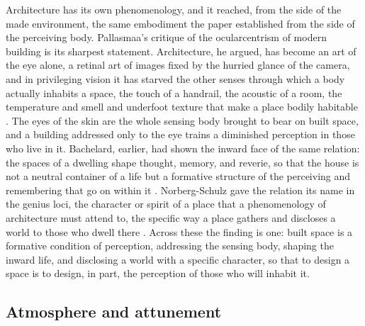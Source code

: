 Architecture has its own phenomenology, and it reached, from the side of the made environment, the same embodiment the paper established from the side of the perceiving body. Pallasmaa's critique of the ocularcentrism of modern building is its sharpest statement. Architecture, he argued, has become an art of the eye alone, a retinal art of images fixed by the hurried glance of the camera, and in privileging vision it has starved the other senses through which a body actually inhabits a space, the touch of a handrail, the acoustic of a room, the temperature and smell and underfoot texture that make a place bodily habitable \parencite{pallasmaa2005}. The eyes of the skin are the whole sensing body brought to bear on built space, and a building addressed only to the eye trains a diminished perception in those who live in it. Bachelard, earlier, had shown the inward face of the same relation: the spaces of a dwelling shape thought, memory, and reverie, so that the house is not a neutral container of a life but a formative structure of the perceiving and remembering that go on within it \parencite{bachelard1994}. Norberg-Schulz gave the relation its name in the genius loci, the character or spirit of a place that a phenomenology of architecture must attend to, the specific way a place gathers and discloses a world to those who dwell there \parencite{norbergschulz1980}. Across these the finding is one: built space is a formative condition of perception, addressing the sensing body, shaping the inward life, and disclosing a world with a specific character, so that to design a space is to design, in part, the perception of those who will inhabit it.

\subsection{Atmosphere and attunement}
\label{p23:sub:space-atmosphere}

